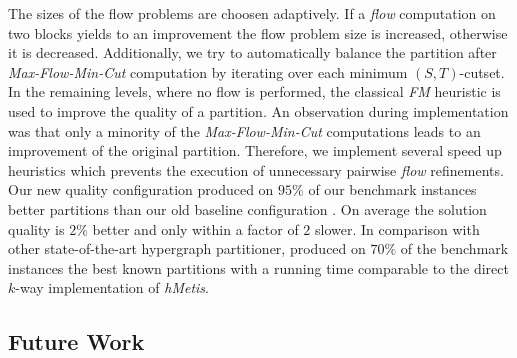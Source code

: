 The sizes of the flow problems are choosen adaptively. If a \emph{flow} computation on two blocks
yields to an improvement the flow problem size is increased, otherwise it is decreased. 
Additionally, we try to automatically balance the partition after \emph{Max-Flow-Min-Cut}
computation by iterating over each minimum $(S,T)$-cutset. In the remaining levels, 
where no flow is performed, the classical \emph{FM} heuristic is used to improve the quality 
of a partition. An observation during implementation was that only a minority of 
the \emph{Max-Flow-Min-Cut} computations leads to an improvement of the original partition. 
Therefore, we implement several speed up heuristics which prevents the
execution of unnecessary pairwise \emph{flow} refinements. \\
Our new quality configuration  produced on $95\%$ of our benchmark instances
better partitions than our old baseline configuration . On average the solution 
quality is $2\%$ better and only within a factor of $2$ slower. In comparison with other 
state-of-the-art hypergraph partitioner,  produced on $70\%$ of the benchmark instances
the best known partitions with a running time comparable to the direct $k$-way implementation
of \emph{hMetis}.


\subsection{Future Work}

